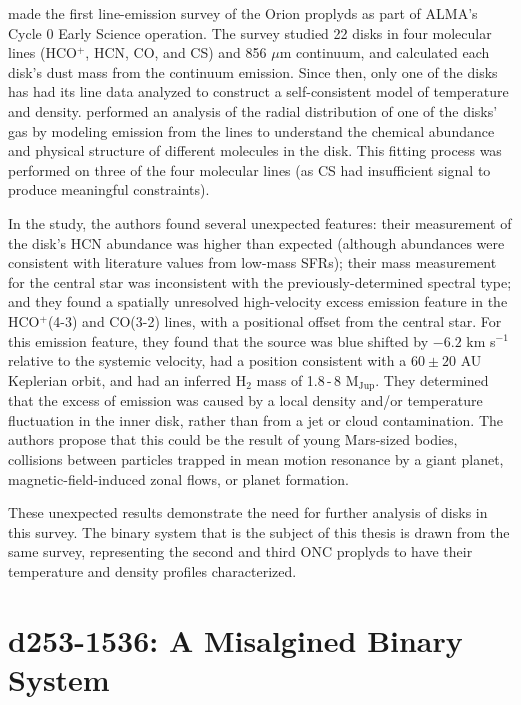 \citet{Mann2014} made the first line-emission survey of the Orion proplyds as part of ALMA's Cycle 0 Early Science operation. The survey studied 22 disks in four molecular lines (HCO$^+$, HCN, CO, and CS) and 856 $\mu$m continuum, and calculated each disk's dust mass from the continuum emission. Since then, only one of the disks has had its line data analyzed to construct a self-consistent model of temperature and density. \citet{Factor2017} performed an analysis of the radial distribution of one of the disks' gas by modeling emission from the lines to understand the chemical abundance and physical structure of different molecules in the disk. This fitting process was performed on three of the four molecular lines (as CS had insufficient signal to produce meaningful constraints).

In the study, the authors found several unexpected features: their measurement of the disk's HCN abundance was higher than expected (although \hco{} abundances were consistent with literature values from low-mass SFRs); their mass measurement for the central star was inconsistent with the previously-determined spectral type; and they found a spatially unresolved high-velocity excess emission feature in the HCO$^+$(4-3) and CO(3-2) lines, with a positional offset from the central star. For this emission feature, they found that the source was blue shifted by $-6.2$ km s$^{-1}$ relative to the systemic velocity, had a position consistent with a $60\pm20$ AU Keplerian orbit, and had an inferred H$_2$ mass of 1.8\,-\,8 M$_\text{Jup}$. They determined that the excess of emission was caused by a local density and/or temperature fluctuation in the inner disk, rather than from a jet or cloud contamination. The authors propose that this could be the result of young Mars-sized bodies, collisions between particles trapped in mean motion resonance by a giant planet, magnetic-field-induced zonal flows, or planet formation.


These unexpected results demonstrate the need for further analysis of disks in this survey. The binary system that is the subject of this thesis is drawn from the same survey, representing the second and third ONC proplyds to have their temperature and density profiles characterized.





\section{d253-1536: A Misalgined Binary System}

